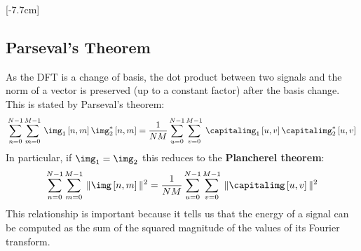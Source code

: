 [-7.7cm]



\subsection{Parseval's Theorem}

As the DFT is a change of basis, the dot product between two signals and the norm of a vector is preserved (up to a constant factor) after the basis change. This is stated by Parseval's theorem:
\begin{equation}
	\sum_{n=0}^{N-1} \sum_{m=0}^{M-1} \,  \img_1 \left[n,m \right] \img_2^* \left[n,m \right] = \frac{1}{NM}\sum_{u=0}^{N-1} \sum_{v=0}^{M-1} \,  \capitalimg_1 \left[u,v \right] \capitalimg_2^* \left[u,v \right]
\end{equation}
In particular, if $\img_1=\img_2$ this reduces to the {\bf Plancherel theorem}:
\begin{equation}
	\sum_{n=0}^{N-1} \sum_{m=0}^{M-1} \,  \| \img \left[n,m \right] \|^2 = \frac{1}{NM}\sum_{u=0}^{N-1} \sum_{v=0}^{M-1} \,  \| \capitalimg \left[u,v \right] \|^2
\end{equation}
This relationship is important because it tells us that the energy of a signal can be computed as the sum of the squared magnitude of the values of its Fourier transform.

